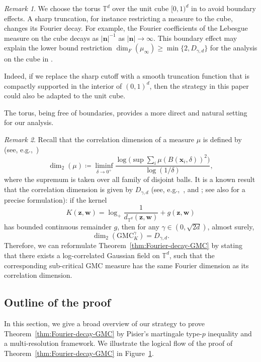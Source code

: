 \documentclass[12pt]{amsart}
\theoremstyle{definition}
\theoremstyle{remark}
\newtheorem*{remark*}{Remark}
\newcommand{\bz}{\boldsymbol{z}}
\newcommand{\bw}{\boldsymbol{w}}
\newcommand{\T}{\mathbb{T}}
\newcommand{\GMC}{\mathrm{GMC}}
\numberwithin{equation}{section}
\begin{document}
\begin{remark*}
We choose the torus $\mathbb{T}^d$ over the unit cube $[0,1)^d$ in \cite{LQT24,LQT25} to avoid boundary effects. A sharp truncation, for instance restricting a measure to the cube, changes its Fourier decay. For example, the Fourier coefficients of the Lebesgue measure on the cube decays as $|\boldsymbol{n}|^{-1}$ as $|\boldsymbol{n}|\to\infty$. This boundary effect may explain the lower bound restriction $\dim_F(\mu_\infty) \ge \min\{2, D_{\gamma,d}\}$ for the analysis on the cube in \cite[Theorem~1.2]{LQT25}.

Indeed, if we replace the sharp cutoff with a smooth truncation function that is compactly supported in the interior of $(0,1)^d$, then the strategy in this paper could also be adapted to the unit cube. 

The torus, being free of boundaries, provides a more direct and natural setting for our analysis.
\end{remark*}

\begin{remark*}
Recall that the correlation dimension of a measure $\mu$ is defined by (see, e.g.,~\cite[Lemma~2.6.6 and Definition~2.6.7]{BSS23})
\[
\dim_2(\mu)\coloneq \liminf_{\delta\to 0^+}\frac{\log \big(\sup\sum_i \mu(B(\boldsymbol{x}_i,\delta))^2\big)}{\log(1/\delta)},
\]
where the supremum is taken over all family of disjoint balls. It is a known result that the correlation dimension is given by $D_{\gamma,d}$ (see, e.g.,~\cite[Theorem~3.1 and Formula(3.2)]{Ber23}, \cite[Section~4.2]{RV14} and \cite[Remark~2]{GV23}; see also \cite[Lemma~3.6]{LQT25} for a precise formulation):  if the kernel
\[
K(\bz,\bw)=\log_+ \frac{1}{d_{\T^d}(\bz,\bw)}+g(\bz,\bw)
\]
has bounded continuous remainder $g$, then for any $\gamma\in (0, \sqrt{2d})$, almost surely, 
\[
\dim_2(\GMC_K^\gamma)=D_{\gamma,d}.
\]
Therefore, we can reformulate Theorem~\ref{thm:Fourier-decay-GMC} by stating that there exists a log-correlated Gaussian field on $\T^d$, such that the corresponding sub-critical GMC measure has the same Fourier dimension as its correlation dimension.
\end{remark*}

\subsection{Outline of the proof}
In this section, we give a broad overview of our strategy to prove Theorem~\ref{thm:Fourier-decay-GMC} by Pisier's martingale type-$p$ inequality and a multi-resolution framework. We illustrate the logical flow of the proof of Theorem~\ref{thm:Fourier-decay-GMC} in Figure~\ref{fig:proof_flow}.
\begin{figure}[omitted: a diagram of this paper's results, not reproduced here]\label{fig:proof_flow}\end{figure}
\end{document}
